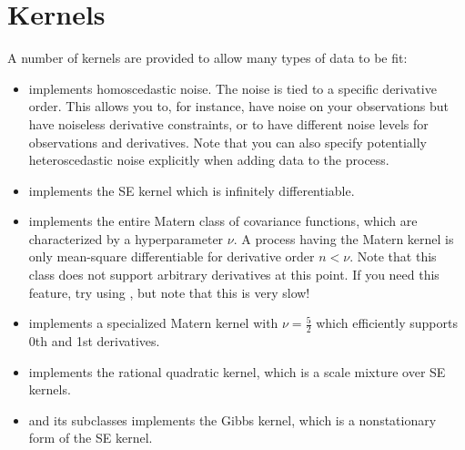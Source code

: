 \documentclass[letterpaper,10pt,english]{sphinxmanual}
\begin{document}
\chapter{Kernels}
\label{index:kernels}
A number of kernels are provided to allow many types of data to be fit:
\begin{itemize}
\item {} 
{\hyperref[gptools.kernel:gptools.kernel.noise.DiagonalNoiseKernel]{}} implements homoscedastic noise. The noise is tied to a specific derivative order. This allows you to, for instance, have noise on your observations but have noiseless derivative constraints, or to have different noise levels for observations and derivatives. Note that you can also specify potentially heteroscedastic noise explicitly when adding data to the process.

\item {} 
{\hyperref[gptools.kernel:gptools.kernel.squared_exponential.SquaredExponentialKernel]{}} implements the SE kernel which is infinitely differentiable.

\item {} 
{\hyperref[gptools.kernel:gptools.kernel.matern.MaternKernel]{}} implements the entire Matern class of covariance functions, which are characterized by a hyperparameter \(\nu\). A process having the Matern kernel is only mean-square differentiable for derivative order \(n<\nu\). Note that this class does not support arbitrary derivatives at this point. If you need this feature, try using {\hyperref[gptools.kernel:gptools.kernel.matern.MaternKernelArb]{}}, but note that this is very slow!

\item {} 
{\hyperref[gptools.kernel:gptools.kernel.matern.Matern52Kernel]{}} implements a specialized Matern kernel with \(\nu=\frac{5}{2}\) which efficiently supports 0th and 1st derivatives.

\item {} 
{\hyperref[gptools.kernel:gptools.kernel.rational_quadratic.RationalQuadraticKernel]{}} implements the rational quadratic kernel, which is a scale mixture over SE kernels.

\item {} 
{\hyperref[gptools.kernel:gptools.kernel.gibbs.GibbsKernel1d]{}} and its subclasses implements the Gibbs kernel, which is a nonstationary form of the SE kernel.


\end{itemize}
\end{document}

